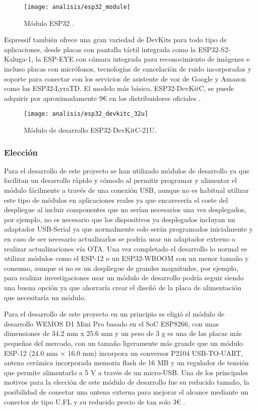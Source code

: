 \documentclass[../proyecto.tex]{subfiles}
\begin{document}
\begin{figure}[H]
\centering
\texttt{[image: analisis/esp32\_module]}
\caption{Módulo ESP32  \cite{esp32_module}.}
\label{fig:esp32_module}
\end{figure}

Espressif también ofrece una gran variedad de DevKits para todo tipo de aplicaciones, desde placas con pantalla táctil integrada como la ESP32-S2-Kaluga-1, la ESP-EYE con cámara integrada para reconocimiento de imágenes e incluso placas con micrófonos, tecnologías de cancelación de ruido incorporadas y soporte para conectar con los servicios de asistente de voz de Google y Amazon como las ESP32-LyraTD. El modelo más básico, ESP32-DevKitC, se puede adquirir por aproximadamente 9€ en los distribuidores oficiales \cite{espressif_provider_digikey} \cite{espressif_provider_mouser}.\\

\begin{figure}[H]
\centering
\texttt{[image: analisis/esp32\_devkitc\_32u]}
\caption{Módulo de desarrollo ESP32-DevKitC-21U.}
\label{fig:esp32_devkitc_32u}
\end{figure}


\subsubsection*{Elección}

Para el desarrollo de este proyecto se han utilizado módulos de desarrollo ya que facilitan un desarrollo rápido y cómodo al permitir programar y alimentar el módulo fácilmente a través de una conexión USB, aunque no es habitual utilizar este tipo de módulos en aplicaciones reales ya que encarecería el coste del despliegue al incluir componentes que no serían necesarios una vez desplegados, por ejemplo, no es necesario que los dispositivos ya desplegados incluyan un adaptador USB-Serial ya que normalmente solo serán programados inicialmente y en caso de ser necesario actualizarlos se podría usar un adaptador externo o realizar actualizaciones vía OTA. Una vez completado el desarrollo lo normal es utilizar módulos como el ESP-12 o un ESP32-WROOM con un menor tamaño y consumo, aunque si no es un despliegue de grandes magnitudes, por ejemplo, para realizar investigaciones usar un módulo de desarrollo podría seguir siendo una buena opción ya que ahorraría crear el diseñó de la placa de alimentación que necesitaría un módulo.

Para el desarrollo de este proyecto en un principio se eligió el módulo de desarrollo WEMOS D1 Mini Pro basado en el SoC ESP8266, con unas dimensiones de 34.2 mm x 25.6 mm y un peso de 3 g es una de las placas más pequeñas del mercado, con un tamaño ligeramente más grande que un módulo ESP-12 (24.0 mm × 16.0 mm) incorpora un conversor P2104 USB-TO-UART, antena cerámica incorporada memoria flash de 16 MB y un regulador de tensión que permite alimentarlo a 5 V a través de un micro-USB. Una de los principales motivos para la elección de este módulo de desarrollo fue su reducido tamaño, la posibilidad de conectar una antena externa para mejorar el alcance mediante un conector de tipo U.FL y su reducido precio de tan solo 3€ \cite{lolin_official_store}. \\
\end{document}
